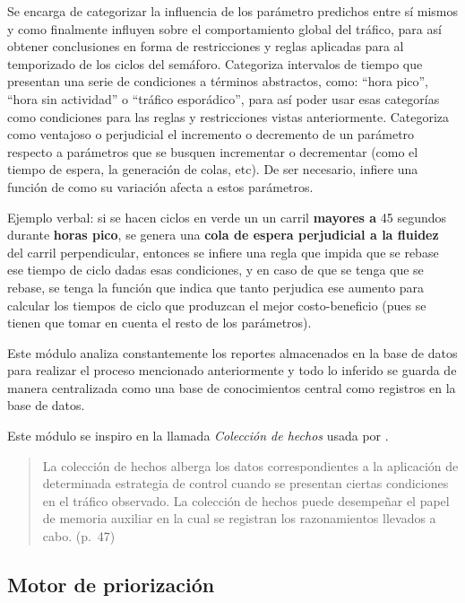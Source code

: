 Se encarga de categorizar la influencia de los parámetro predichos entre
sí mismos y como finalmente influyen sobre el comportamiento global del
tráfico, para así obtener conclusiones en forma de restricciones y
reglas aplicadas para al temporizado de los ciclos del semáforo.
Categoriza intervalos de tiempo que presentan una serie de condiciones a
términos abstractos, como: ``hora pico'', ``hora sin actividad'' o
``tráfico esporádico'', para así poder usar esas categorías como
condiciones para las reglas y restricciones vistas anteriormente.
Categoriza como ventajoso o perjudicial el incremento o decremento de un
parámetro respecto a parámetros que se busquen incrementar o decrementar
(como el tiempo de espera, la generación de colas, etc). De ser
necesario, infiere una función de como su variación afecta a estos
parámetros.

Ejemplo verbal: si se hacen ciclos en verde un un carril \textbf{mayores
a} 45 segundos durante \textbf{horas pico}, se genera una \textbf{cola
de espera perjudicial a la fluidez} del carril perpendicular, entonces
se infiere una regla que impida que se rebase ese tiempo de ciclo dadas
esas condiciones, y en caso de que se tenga que se rebase, se tenga la
función que indica que tanto perjudica ese aumento para calcular los
tiempos de ciclo que produzcan el mejor costo-beneficio (pues se tienen
que tomar en cuenta el resto de los parámetros).

Este módulo analiza constantemente los reportes almacenados en la base
de datos para realizar el proceso mencionado anteriormente y todo lo
inferido se guarda de manera centralizada como una base de conocimientos
central como registros en la base de datos.

Este módulo se inspiro en la llamada \emph{Colección de hechos} usada
por \textcite{JoelTrejo2006}.

\begin{quote}
La colección de hechos alberga los datos correspondientes a la
aplicación de determinada estrategia de control cuando se presentan
ciertas condiciones en el tráfico observado. La colección de hechos
puede desempeñar el papel de memoria auxiliar en la cual se registran
los razonamientos llevados a cabo. (p.~47)
\end{quote}

\hypertarget{motor-de-priorizaciuxf3n}{%
\subsection{Motor de priorización}\label{motor-de-priorizaciuxf3n}}

